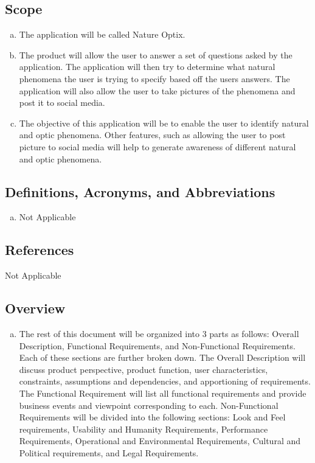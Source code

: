 \documentclass[]{article}
\begin{document}
\subsection{Scope}
\label{sub:scope}
\begin{enumerate}[a)]
	\item The application will be called Nature Optix.
	\item The product will allow the user to answer a set of questions asked by the application. The application will then try to determine what natural phenomena the user is trying to specify based off the users answers. The application will also allow the user to take pictures of the phenomena and post it to social media. 
	\item The objective of this application will be to enable the user to identify natural and optic phenomena. Other features, such as allowing the user to post picture to social media will help to generate awareness of different natural and optic phenomena. 
\end{enumerate}

\subsection{Definitions, Acronyms, and Abbreviations}
\label{sub:definitions_acronyms_and_abbreviations}
\begin{enumerate}[a)]
	\item Not Applicable
\end{enumerate}

\subsection{References}
\label{sub:references}
Not Applicable

\subsection{Overview}
\label{sub:overview}
\begin{enumerate}[a)]
	\item The rest of this document will be organized into 3 parts as follows: Overall Description, Functional Requirements, and Non-Functional Requirements. Each of these sections are further broken down. The Overall Description will discuss product perspective, product function, user characteristics, constraints, assumptions and dependencies, and apportioning of requirements. The Functional Requirement will list all functional requirements and provide business events and viewpoint corresponding to each. Non-Functional Requirements will be divided into the following sections: Look and Feel requirements, Usability and Humanity Requirements, Performance Requirements, Operational and Environmental Requirements, Cultural and Political requirements, and Legal Requirements. 
\end{enumerate}
\end{document}
